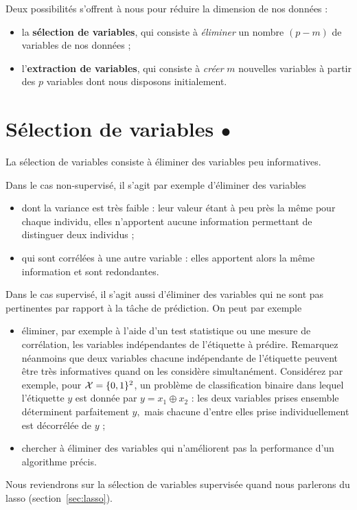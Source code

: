 Deux possibilités s'offrent à nous pour réduire la dimension de nos données :
\begin{itemize}
\item la \textbf{sélection de variables}, qui consiste à \textit{éliminer} un nombre
  $(p-m)$ de variables de nos données ;
\item l'\textbf{extraction de variables}, qui consiste à {\it créer} $m$
  nouvelles variables à partir des $p$ variables dont nous disposons
  initialement.
\end{itemize}



\section{Sélection de variables $\bullet$} 

La sélection de variables consiste à éliminer des variables peu informatives.

Dans le cas non-supervisé, il s'agit par exemple d'éliminer des variables
\begin{itemize}
\item dont la variance est très faible : leur valeur étant à peu près la même
  pour chaque individu, elles n'apportent aucune information permettant de
  distinguer deux individus ;
\item qui sont corrélées à une autre variable : elles apportent alors la même
  information et sont redondantes.
\end{itemize}

Dans le cas supervisé, il s'agit aussi d'éliminer des variables qui ne sont pas
pertinentes par rapport à la tâche de prédiction. On peut par exemple
\begin{itemize}
\item éliminer, par exemple à l'aide d'un test statistique ou une mesure de corrélation,
  les variables indépendantes de l'étiquette à prédire. Remarquez néanmoins que
  deux variables chacune indépendante de l'étiquette peuvent être très
  informatives quand on les considère simultanément. Considérez par exemple,
  pour $\mathcal{X} = \lbrace 0, 1 \rbrace^2$, un problème de classification binaire dans lequel
  l'étiquette $y$ est donnée par $y = x_1 \oplus x_2$ : les deux variables
  prises ensemble déterminent parfaitement $y,$ mais chacune d'entre elles
  prise individuellement est décorrélée de $y$ ;
\item chercher à éliminer des variables qui n'améliorent pas la performance
  d'un algorithme précis.
\end{itemize}
Nous reviendrons sur la
sélection de variables supervisée quand nous parlerons du lasso
(section~\ref{sec:lasso}).



